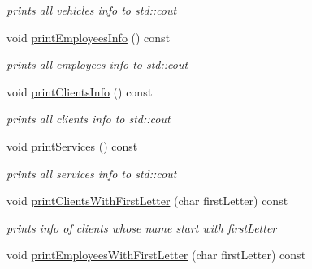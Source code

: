 \begin{DoxyCompactItemize}
\begin{DoxyCompactList}\small\item\em prints all vehicles info to std\+::cout \end{DoxyCompactList}\item 
\hypertarget{class_auto_repair_shop_a4b58d4ec794efc662bb386b8290e5fc0}{}void \hyperlink{class_auto_repair_shop_a4b58d4ec794efc662bb386b8290e5fc0}{print\+Employees\+Info} () const \label{class_auto_repair_shop_a4b58d4ec794efc662bb386b8290e5fc0}

\begin{DoxyCompactList}\small\item\em prints all employees info to std\+::cout \end{DoxyCompactList}\item 
\hypertarget{class_auto_repair_shop_a9a783b43f65c9607fafad8483a27a2f0}{}void \hyperlink{class_auto_repair_shop_a9a783b43f65c9607fafad8483a27a2f0}{print\+Clients\+Info} () const \label{class_auto_repair_shop_a9a783b43f65c9607fafad8483a27a2f0}

\begin{DoxyCompactList}\small\item\em prints all clients info to std\+::cout \end{DoxyCompactList}\item 
\hypertarget{class_auto_repair_shop_a847c5195a614319d6ffead105b3d3460}{}void \hyperlink{class_auto_repair_shop_a847c5195a614319d6ffead105b3d3460}{print\+Services} () const \label{class_auto_repair_shop_a847c5195a614319d6ffead105b3d3460}

\begin{DoxyCompactList}\small\item\em prints all services info to std\+::cout \end{DoxyCompactList}\item 
\hypertarget{class_auto_repair_shop_a401d7e7c76e91072b93aad5a8d12ee11}{}void \hyperlink{class_auto_repair_shop_a401d7e7c76e91072b93aad5a8d12ee11}{print\+Clients\+With\+First\+Letter} (char first\+Letter) const \label{class_auto_repair_shop_a401d7e7c76e91072b93aad5a8d12ee11}

\begin{DoxyCompactList}\small\item\em prints info of clients whose name start with first\+Letter \end{DoxyCompactList}\item 
\hypertarget{class_auto_repair_shop_a69c89ed9eeb98e07ccd8a4771e34c33f}{}void \hyperlink{class_auto_repair_shop_a69c89ed9eeb98e07ccd8a4771e34c33f}{print\+Employees\+With\+First\+Letter} (char first\+Letter) const \label{class_auto_repair_shop_a69c89ed9eeb98e07ccd8a4771e34c33f}


\end{DoxyCompactItemize}
